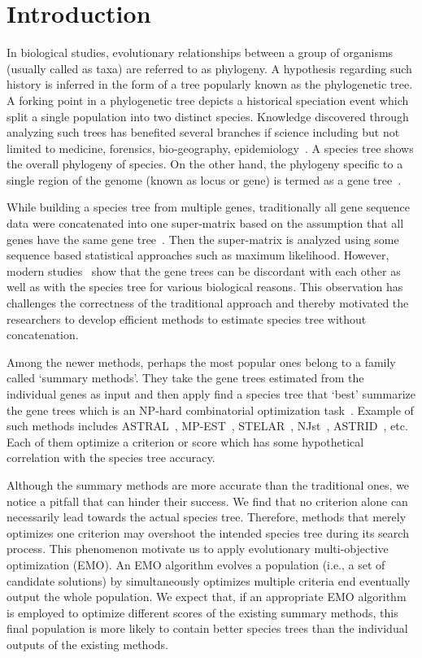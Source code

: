 \section{Introduction}

In biological studies, evolutionary relationships between a group of organisms (usually called as taxa) are referred to as phylogeny. A hypothesis regarding such history is inferred in the form of a tree popularly known as the phylogenetic tree. A forking point in a phylogenetic tree depicts a historical speciation event which split a single population into two distinct species.  Knowledge discovered through analyzing such trees has benefited several branches if science including but not limited to medicine, forensics, bio-geography, epidemiology~\cite{felix2015phylogenetics}. A species tree shows the overall phylogeny of species. On the other hand, the phylogeny specific to a single region of the genome (known as locus or gene) is termed as a gene tree~\cite{maddison1997gene}. 

While building a species tree from multiple genes, traditionally all gene sequence data were concatenated into one super-matrix based on the assumption that all genes have the same gene tree~\cite{huelsenbeck1996combining, de2007supermatrix}. Then the super-matrix is analyzed using some sequence based statistical approaches such as maximum likelihood. However, modern studies~\cite{zwickl2014disentangling, jarvis2014whole} show that the gene trees can be discordant with each other as well as with the species tree for various biological reasons. This observation has challenges the correctness of the traditional approach and thereby motivated the researchers to develop efficient methods to estimate species tree without concatenation. 

Among the newer methods, perhaps the most popular ones belong to a family called `summary methods'. They take the gene trees estimated from the individual genes as input and then apply find a species tree that `best' summarize the gene trees which is an NP-hard combinatorial optimization task~\cite{mirarab2014astral}. Example of such methods includes ASTRAL~\cite{mirarab2014astral}, MP-EST~\cite{liu2010maximum}, STELAR~\cite{islam2019stelar}, NJst~\cite{liu2011estimating}, ASTRID~\cite{vachaspati2015astrid}, etc. Each of them optimize a criterion or score which has some hypothetical correlation with the species tree accuracy. 

Although the summary methods are more accurate than the traditional ones, we notice a pitfall that can hinder their success. We find that no criterion alone can necessarily lead towards the actual species tree. Therefore, methods that merely optimizes one criterion may overshoot the intended species tree during its search process. This phenomenon motivate us to apply evolutionary multi-objective optimization (EMO). An EMO algorithm evolves a population (i.e., a set of candidate solutions) by simultaneously optimizes multiple criteria end eventually output the whole population. We expect that, if an appropriate EMO algorithm is employed to optimize different scores of the existing summary methods, this final population is more likely to contain better species trees than the individual outputs of the existing methods. 


